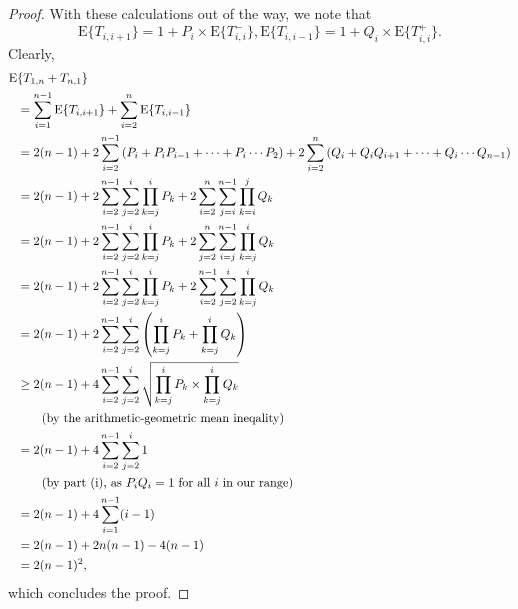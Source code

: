 \documentclass [letterpaper] {patmorin}
\newcommand{\EXP}{\mathrm{E}}
\begin{document}
\begin{proof}
With these calculations out of the way,  we note that
\[
\EXP \{ T_{i,i+1} \} = 1 + P_i \times \EXP \{ T^-_{i, i} \},
\EXP \{ T_{i,i-1} \} = 1 + Q_i \times \EXP \{ T^+_{i, i} \}.
\]
Clearly,
\[
\begin{aligned}
\EXP &\{  T_{1,n} + T_{n,1} \} \\
&= \sum_{i=1}^{n-1} \EXP \{ T_{i,i+1} \} + \sum_{i=2}^n \EXP \{ T_{i,i-1} \} \\
&= 2(n-1) + 2\sum_{i=2}^{n-1} \left( P_i + P_i P_{i-1} + \cdots + P_i \cdots P_{2} \right) + 2\sum_{i=2}^n \left( Q_i + Q_i Q_{i+1} + \cdots + Q_i \cdots Q_{n-1} \right) \\
&= 2(n-1) + 2\sum_{i=2}^{n-1} \sum_{j=2}^i \prod_{k=j}^i P_k + 2\sum_{i=2}^n \sum_{j=i}^{n-1} \prod_{k=i}^j Q_k  \\
&= 2(n-1) + 2\sum_{i=2}^{n-1} \sum_{j=2}^i \prod_{k=j}^i P_k + 2\sum_{j=2}^n \sum_{i=j}^{n-1} \prod_{k=j}^i Q_k  \\
&= 2(n-1) + 2\sum_{i=2}^{n-1} \sum_{j=2}^i \prod_{k=j}^i P_k + 2\sum_{i=2}^{n-1} \sum_{j=2}^i \prod_{k=j}^i Q_k  \\
&= 2(n-1) + 2\sum_{i=2}^{n-1} \sum_{j=2}^i \left( \prod_{k=j}^i P_k + \prod_{k=j}^i Q_k \right)  \\
&\ge 2(n-1) + 4\sum_{i=2}^{n-1} \sum_{j=2}^i \sqrt{ \prod_{k=j}^i P_k \times \prod_{k=j}^i Q_k } \\
&\qquad \hbox{\rm (by the arithmetic-geometric mean ineqality)} \\
&= 2(n-1) + 4\sum_{i=2}^{n-1} \sum_{j=2}^i  1 \\
&\qquad \hbox{\rm (by part (i), as $P_iQ_i = 1$ for all $i$ in our range)} \\
&= 2(n-1) + 4\sum_{i=1}^{n-1} (i-1) \\
&= 2(n-1) + 2 n (n-1) - 4 (n-1) \\
&= 2(n-1)^2,\\
\end{aligned}
\]
which concludes the proof.
\end{proof}
\end{document}
